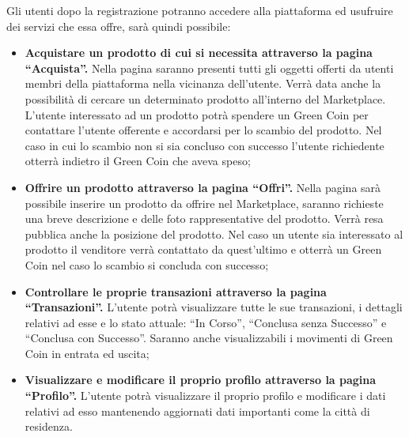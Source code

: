 Gli utenti dopo la registrazione potranno accedere alla piattaforma ed usufruire dei servizi che essa offre, sarà quindi possibile:  
\begin{itemize}
    \item \textbf{Acquistare un prodotto di cui si necessita attraverso la pagina “Acquista”.} Nella pagina saranno presenti tutti gli oggetti offerti da utenti membri della piattaforma nella vicinanza dell'utente. Verrà data anche la possibilità di cercare un determinato prodotto all'interno del Marketplace. L'utente interessato ad un prodotto potrà spendere un Green Coin per contattare l'utente offerente e accordarsi per lo scambio del prodotto. Nel caso in cui lo scambio non si sia concluso con successo l'utente richiedente otterrà indietro il Green Coin che aveva speso;
    \item \textbf{Offrire un prodotto attraverso la pagina “Offri”.} Nella pagina sarà possibile inserire un prodotto da offrire nel Marketplace, saranno richieste una breve descrizione e delle foto rappresentative del prodotto. Verrà resa pubblica anche la posizione del prodotto. Nel caso un utente sia interessato al prodotto il venditore verrà contattato da quest'ultimo e otterrà un Green Coin nel caso lo scambio si concluda con successo;
    \item \textbf{Controllare le proprie transazioni attraverso la pagina “Transazioni”.} L'utente potrà visualizzare tutte le sue transazioni, i dettagli relativi ad esse e lo stato attuale: “In Corso”, “Conclusa senza Successo” e “Conclusa con Successo”. Saranno anche visualizzabili i movimenti di Green Coin in entrata ed uscita;
    \item \textbf{Visualizzare e modificare il proprio profilo attraverso la pagina “Profilo”.} L'utente potrà visualizzare il proprio profilo e modificare i dati relativi ad esso mantenendo aggiornati dati importanti come la città di residenza.
\end{itemize}